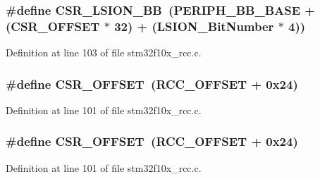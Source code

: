 \subsubsection[{\texorpdfstring{C\+S\+R\+\_\+\+L\+S\+I\+O\+N\+\_\+\+BB}{CSR_LSION_BB}}]{\setlength{\rightskip}{0pt plus 5cm}\#define C\+S\+R\+\_\+\+L\+S\+I\+O\+N\+\_\+\+BB~({\bf P\+E\+R\+I\+P\+H\+\_\+\+B\+B\+\_\+\+B\+A\+SE} + ({\bf C\+S\+R\+\_\+\+O\+F\+F\+S\+ET} $\ast$ 32) + ({\bf L\+S\+I\+O\+N\+\_\+\+Bit\+Number} $\ast$ 4))}\hypertarget{group___r_c_c___private___defines_gaa253e36e7e5fb02998c0e4d0388abc52}{}\label{group___r_c_c___private___defines_gaa253e36e7e5fb02998c0e4d0388abc52}


Definition at line 103 of file stm32f10x\+\_\+rcc.\+c.

\subsubsection[{\texorpdfstring{C\+S\+R\+\_\+\+O\+F\+F\+S\+ET}{CSR_OFFSET}}]{\setlength{\rightskip}{0pt plus 5cm}\#define C\+S\+R\+\_\+\+O\+F\+F\+S\+ET~({\bf R\+C\+C\+\_\+\+O\+F\+F\+S\+ET} + 0x24)}\hypertarget{group___r_c_c___private___defines_ga984cbe73312b6d3d355c5053763d499a}{}\label{group___r_c_c___private___defines_ga984cbe73312b6d3d355c5053763d499a}


Definition at line 101 of file stm32f10x\+\_\+rcc.\+c.

\subsubsection[{\texorpdfstring{C\+S\+R\+\_\+\+O\+F\+F\+S\+ET}{CSR_OFFSET}}]{\setlength{\rightskip}{0pt plus 5cm}\#define C\+S\+R\+\_\+\+O\+F\+F\+S\+ET~({\bf R\+C\+C\+\_\+\+O\+F\+F\+S\+ET} + 0x24)}\hypertarget{group___r_c_c___private___defines_ga984cbe73312b6d3d355c5053763d499a}{}\label{group___r_c_c___private___defines_ga984cbe73312b6d3d355c5053763d499a}


Definition at line 101 of file stm32f10x\+\_\+rcc.\+c.


